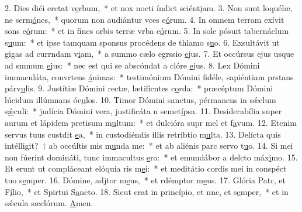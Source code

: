 2. Dies diéi erctat v\uline{e}rbum,~* et nox nocti índict sciént\uline{i}am.
3. Non sunt loquélæ, ne serm\uline{ó}nes,~* quorum non audiántur vces e\uline{ó}rum.
4. In omnem terram exívit sons e\uline{ó}rum:~* et in fines orbis terræ vrba e\uline{ó}rum.
5. In sole pósuit tabernáclum s\uline{u}um:~* et ipse tamquam sponsus procédens de thlamo s\uline{u}o.
6. Exsultávit ut gigas ad currndam v\uline{i}am,~* a summo cælo egrssio \uline{e}jus.
7. Et occúrsus ejus usque ad smmum \uline{e}jus:~* nec est qui se abscóndat a clóre \uline{e}jus.
8. Lex Dómini immaculáta, convrtens \uline{á}nimas:~* testimónium Dómini fidéle, sapiéntiam prstans párv\uline{u}lis.
9. Justítiæ Dómini rectæ, lætificntes c\uline{o}rda:~* præcéptum Dómini lúcidum illúmnans óc\uline{u}los.
10. Timor Dómini sanctus, pérmanens in sǽclum s\uline{ǽ}culi:~* judícia Dómini vera, justificáta n semet\uline{í}psa.
11. Desiderabília super aurum et lápidem pretisum m\uline{u}ltum:~* et dulcióra supr mel et f\uline{a}vum.
12. Etenim servus tuus custdit \uline{e}a,~* in custodiéndis illis retribtio m\uline{u}lta.
13. Delícta quis intélligit?~† ab occúltis mis m\uline{u}nda me:~* et ab aliénis parc servo t\uline{u}o.
14. Si mei non fúerint domináti, tunc immacultus \uline{e}ro:~* et emundábor a delcto máx\uline{i}mo.
15. Et erunt ut compláceant elóquia ris m\uline{e}i:~* et meditátio cordis mei in conspéct tuo s\uline{e}mper.
16. Dómine, adjtor m\uline{e}us,~* et rdémptor m\uline{e}us.
17. Glória Patr, et F\uline{í}lio,~* et Spirtui S\uline{a}ncto.
18. Sicut erat in princípio, et nnc, et s\uline{e}mper,~* et in sǽcula sæclórum. \uline{A}men.
